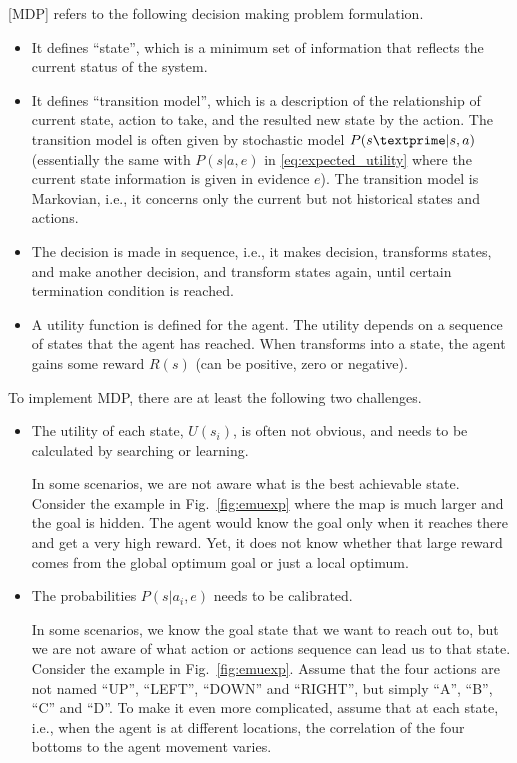 [MDP] refers to the following decision making problem formulation. 
\begin{itemize}
	\item It defines ``state'', which is a minimum set of information that reflects the current status of the system.
	\item It defines ``transition model'', which is a description of the relationship of current state, action to take, and the resulted new state by the action. The transition model is often given by stochastic model $P(s\textprime|s,a)$ (essentially the same with $P(s|a,e)$ in \eqref{eq:expected_utility} where the current state information is given in evidence $e$). The transition model is Markovian, i.e., it concerns only the current but not historical states and actions.
	\item The decision is made in sequence, i.e., it makes decision, transforms states, and make another decision, and transform states again, until certain termination condition is reached.
	\item A utility function is defined for the agent. The utility depends on a sequence of states that the agent has reached. When transforms into a state, the agent gains some reward $R(s)$ (can be positive, zero or negative).
\end{itemize}

To implement MDP, there are at least the following two challenges.
\begin{itemize}
	\item The utility of each state, $U(s_i)$, is often not obvious, and needs to be calculated by searching or learning.
	
	In some scenarios, we are not aware what is the best achievable state. Consider the example in Fig.~\ref{fig:emuexp} where the map is much larger and the goal is hidden. The agent would know the goal only when it reaches there and get a very high reward. Yet, it does not know whether that large reward comes from the global optimum goal or just a local optimum.
	
	\item The probabilities $P(s|a_i,e)$ needs to be calibrated.
	
	In some scenarios, we know the goal state that we want to reach out to, but we are not aware of what action or actions sequence can lead us to that state. Consider the example in Fig.~\ref{fig:emuexp}. Assume that the four actions are not named ``UP'', ``LEFT'', ``DOWN'' and ``RIGHT'', but simply ``A'', ``B'', ``C'' and ``D''. To make it even more complicated, assume that at each state, i.e., when the agent is at different locations, the correlation of the four bottoms to the agent movement varies.
	
\end{itemize}


